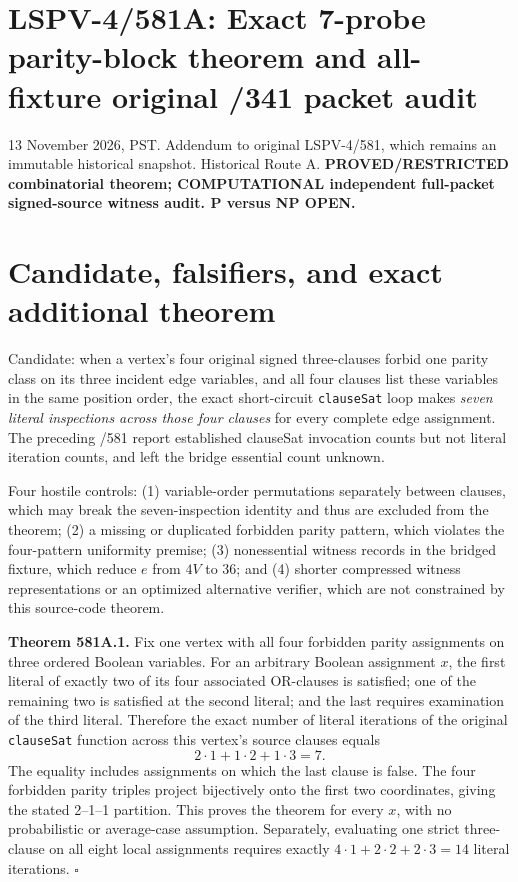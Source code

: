 \documentclass[11pt]{article}
\begin{document}
\section*{LSPV-4/581A: Exact 7-probe parity-block theorem and all-fixture original /341 packet audit}
13 November 2026, PST. Addendum to original LSPV-4/581, which remains an immutable historical snapshot. Historical Route A. \textbf{PROVED/RESTRICTED combinatorial theorem; COMPUTATIONAL independent full-packet signed-source witness audit. P versus NP OPEN.}

\section*{Candidate, falsifiers, and exact additional theorem}
Candidate: when a vertex's four original signed three-clauses forbid one parity class on its three incident edge variables, and all four clauses list these variables in the same position order, the exact short-circuit \texttt{clauseSat} loop makes \emph{seven literal inspections across those four clauses} for every complete edge assignment. The preceding /581 report established clauseSat invocation counts but not literal iteration counts, and left the bridge essential count unknown.

Four hostile controls: (1) variable-order permutations separately between clauses, which may break the seven-inspection identity and thus are excluded from the theorem; (2) a missing or duplicated forbidden parity pattern, which violates the four-pattern uniformity premise; (3) nonessential witness records in the bridged fixture, which reduce $e$ from $4V$ to 36; and (4) shorter compressed witness representations or an optimized alternative verifier, which are not constrained by this source-code theorem.

\textbf{Theorem 581A.1.} Fix one vertex with all four forbidden parity assignments on three ordered Boolean variables. For an arbitrary Boolean assignment $x$, the first literal of exactly two of its four associated OR-clauses is satisfied; one of the remaining two is satisfied at the second literal; and the last requires examination of the third literal. Therefore the exact number of literal iterations of the original \texttt{clauseSat} function across this vertex's source clauses equals
\[
\boxed{2\cdot 1+1\cdot 2+1\cdot 3=7}.
\]
The equality includes assignments on which the last clause is false. The four forbidden parity triples project bijectively onto the first two coordinates, giving the stated 2--1--1 partition. This proves the theorem for every $x$, with no probabilistic or average-case assumption. Separately, evaluating one strict three-clause on all eight local assignments requires exactly $4\cdot1+2\cdot2+2\cdot3=14$ literal iterations. \(\square\)
\end{document}
